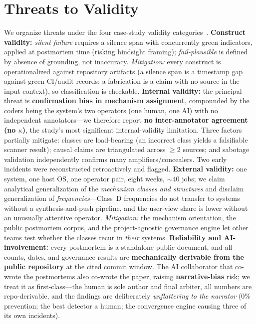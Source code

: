 \documentclass[conference]{IEEEtran}
\begin{document}
\section{Threats to Validity}\label{sec:threats}
We organize threats under the four case-study validity
categories~\cite{runeson2009case}. \textbf{Construct validity:}
\emph{silent failure} requires a silence span with concurrently green
indicators, applied at postmortem time (risking hindsight framing);
\emph{fail-plausible} is defined by absence of grounding, not inaccuracy.
\emph{Mitigation:} every construct is operationalized against repository
artifacts (a silence span is a timestamp gap against green CI/audit
records; a fabrication is a claim with no source in the input context), so
classification is checkable. \textbf{Internal validity:} the principal
threat is \textbf{confirmation bias in mechanism assignment}, compounded
by the coders being the system's two operators (one human, one AI) with no
independent annotators---we therefore report \textbf{no inter-annotator
agreement (no $\kappa$)}, the study's most significant internal-validity
limitation. Three factors partially mitigate: classes are load-bearing (an
incorrect class yields a falsifiable scanner result); causal claims are
triangulated across $\geq$2 sources; and sabotage validation independently
confirms many amplifiers/concealers. Two early incidents were
reconstructed retroactively and flagged. \textbf{External validity:} one
system, one host OS, one operator pair, eight weeks, $\sim$40 jobs; we
claim analytical generalization of the \emph{mechanism classes and
structures} and disclaim generalization of \emph{frequencies}---Class~D
frequencies do not transfer to systems without a synthesis-and-push
pipeline, and the user-view share is lower without an unusually attentive
operator. \emph{Mitigation:} the mechanism orientation, the public
postmortem corpus, and the project-agnostic governance engine let other
teams test whether the classes recur in \emph{their} systems.
\textbf{Reliability and AI-involvement:} every postmortem is a standalone
public document, and all counts, dates, and governance results are
\textbf{mechanically derivable from the public repository} at the cited
commit window. The AI collaborator that co-wrote the postmortems also
co-wrote the paper, raising \textbf{narrative-bias} risk; we treat it as
first-class---the human is sole author and final arbiter, all numbers are
repo-derivable, and the findings are deliberately \emph{unflattering to
the narrator} (0\% prevention; the best detector a human; the convergence
engine causing three of its own incidents).
\end{document}
